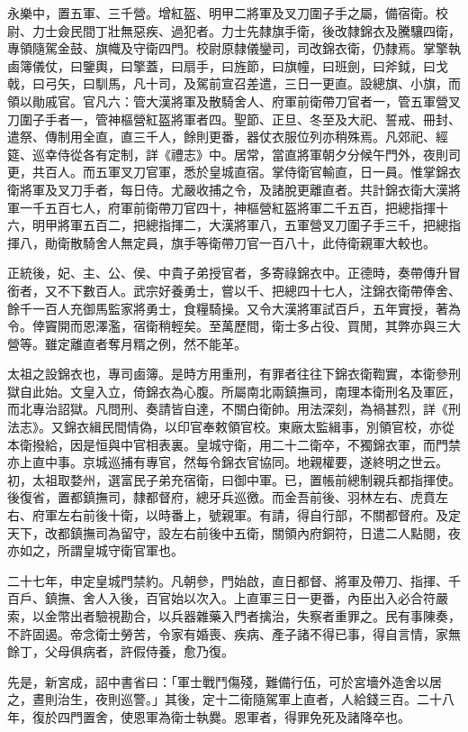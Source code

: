 永樂中，置五軍、三千營。增紅盔、明甲二將軍及叉刀圍子手之屬，備宿衛。校尉、力士僉民間丁壯無惡疾、過犯者。力士先隸旗手衛，後改隸錦衣及騰驤四衛，專領隨駕金鼓、旗幟及守衛四門。校尉原隸儀鑾司，司改錦衣衛，仍隸焉。掌擎執鹵簿儀仗，曰鑒輿，曰擎蓋，曰扇手，曰旌節，曰旗幢，曰班劍，曰斧鉞，曰戈戟，曰弓矢，曰馴馬，凡十司，及駕前宣召差遣，三日一更直。設總旗、小旗，而領以勛戚官。官凡六：管大漢將軍及散騎舍人、府軍前衛帶刀官者一，管五軍營叉刀圍子手者一，管神樞營紅盔將軍者四。聖節、正旦、冬至及大祀、誓戒、冊封、遣祭、傳制用全直，直三千人，餘則更番，器仗衣服位列亦稍殊焉。凡郊祀、經筵、巡幸侍從各有定制，詳《禮志》中。居常，當直將軍朝夕分候午門外，夜則司更，共百人。而五軍叉刀官軍，悉於皇城直宿。掌侍衛官輸直，日一員。惟掌錦衣衛將軍及叉刀手者，每日侍。尤嚴收捕之令，及諸脫更離直者。共計錦衣衛大漢將軍一千五百七人，府軍前衛帶刀官四十，神樞營紅盔將軍二千五百，把總指揮十六，明甲將軍五百二，把總指揮二，大漢將軍八，五軍營叉刀圍子手三千，把總指揮八，勛衛散騎舍人無定員，旗手等衛帶刀官一百八十，此侍衛親軍大較也。

正統後，妃、主、公、侯、中貴子弟授官者，多寄祿錦衣中。正德時，奏帶傳升冒銜者，又不下數百人。武宗好養勇士，嘗以千、把總四十七人，注錦衣衛帶俸舍、餘千一百人充御馬監家將勇士，食糧騎操。又令大漢將軍試百戶，五年實授，著為令。倖竇開而恩澤濫，宿衛稍輕矣。至萬歷間，衛士多占役、買閒，其弊亦與三大營等。雖定離直者奪月糈之例，然不能革。

太祖之設錦衣也，專司鹵簿。是時方用重刑，有罪者往往下錦衣衛鞫實，本衛參刑獄自此始。文皇入立，倚錦衣為心腹。所屬南北兩鎮撫司，南理本衛刑名及軍匠，而北專治詔獄。凡問刑、奏請皆自達，不關白衛帥。用法深刻，為禍甚烈，詳《刑法志》。又錦衣緝民間情偽，以印官奉敕領官校。東廠太監緝事，別領官校，亦從本衛撥給，因是恒與中官相表裏。皇城守衛，用二十二衛卒，不獨錦衣軍，而門禁亦上直中事。京城巡捕有專官，然每令錦衣官協同。地親權要，遂終明之世云。初，太祖取婺州，選富民子弟充宿衛，曰御中軍。已，置帳前總制親兵都指揮使。後復省，置都鎮撫司，隸都督府，總牙兵巡徼。而金吾前後、羽林左右、虎賁左右、府軍左右前後十衛，以時番上，號親軍。有請，得自行部，不關都督府。及定天下，改都鎮撫司為留守，設左右前後中五衛，關領內府銅符，日遣二人點閱，夜亦如之，所謂皇城守衛官軍也。

二十七年，申定皇城門禁約。凡朝參，門始啟，直日都督、將軍及帶刀、指揮、千百戶、鎮撫、舍人入後，百官始以次入。上直軍三日一更番，內臣出入必合符嚴索，以金幣出者驗視勘合，以兵器雜藥入門者擒治，失察者重罪之。民有事陳奏，不許固遏。帝念衛士勞苦，令家有婚喪、疾病、產子諸不得已事，得自言情，家無餘丁，父母俱病者，許假侍養，愈乃復。

先是，新宮成，詔中書省曰：「軍士戰鬥傷殘，難備行伍，可於宮墻外造舍以居之，晝則治生，夜則巡警。」其後，定十二衛隨駕軍上直者，人給錢三百。二十八年，復於四門置舍，使恩軍為衛士執爨。恩軍者，得罪免死及諸降卒也。


